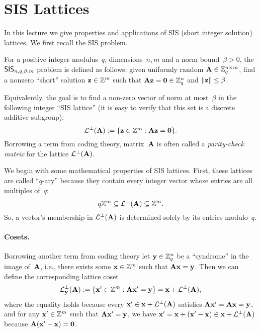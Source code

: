 \documentclass[11pt]{article}
\begin{document}
\thispagestyle{fancy} %


\section{SIS Lattices}
\label{sec:sis-lat}

In this lecture we give properties and applications of SIS (short
integer solution) lattices. We first recall the SIS problem.

\begin{definition}
  \label{def:sis-problem}
  For a positive integer modulus~$q$, dimensions~$n,m$ and a norm
  bound~$\beta > 0$, the $\mathsf{SIS}_{n,q,\beta,m}$ problem is defined as
  follows: given uniformly random $\mathbf{A} \in \mathbb{Z}_q^{n \times m}$, find a
  nonzero ``short'' solution $\mathbf{z} \in \mathbb{Z}^{m}$ such that
  $\mathbf{A} \mathbf{z} = \mathbf{0} \in \mathbb{Z}_q^{n}$ and
  $\lVert\mathbf{z}\rVert \leq \beta$.

  Equivalently, the goal is to find a non-zero vector of norm at
  most~$\beta$ in the following integer ``SIS lattice'' (it is easy to
  verify that this set is a discrete additive subgroup):
  \[ \mathcal{L}^{\perp}(\mathbf{A}) := \{\mathbf{z} \in \mathbb{Z}^{m} : \mathbf{A}\mathbf{z} = \mathbf{0}\}
    . \] Borrowing a term from coding theory, matrix~$\mathbf{A}$ is often
  called a \emph{parity-check matrix} for the lattice
  $\mathcal{L}^{\perp}(\mathbf{A})$.
\end{definition}

We begin with some mathematical properties of SIS lattices. First,
these lattices are called ``$q$-ary'' because they contain every
integer vector whose entries are all multiples of~$q$:
\[
  q\mathbb{Z}^{m} \subseteq \mathcal{L}^{\perp}(\mathbf{A}) \subseteq \mathbb{Z}^{m}.
\]
So, a vector's membership in $\mathcal{L}^{\perp}(\mathbf{A})$ is determined solely by
its entries modulo~$q$.

\paragraph{Cosets.}

Borrowing another term from coding theory let $\mathbf{y} \in \mathbb{Z}_q^{n}$ be a
``syndrome'' in the image of~$\mathbf{A}$, i.e., there exists some
$\mathbf{x} \in \mathbb{Z}^{m}$ such that $\mathbf{A} \mathbf{x} = \mathbf{y}$. Then we can define
the corresponding lattice coset
\[
  \mathcal{L}^{\perp}_{\mathbf{y}}(\mathbf{A}) := \{ \mathbf{x}' \in \mathbb{Z}^m : \mathbf{A} \mathbf{x}' =
    \mathbf{y} \} = \mathbf{x} + \mathcal{L}^{\perp}(\mathbf{A}) , \] where the equality holds
because every $\mathbf{x}' \in \mathbf{x} + \mathcal{L}^{\perp}(\mathbf{A})$ satisfies
$\mathbf{A} \mathbf{x}' = \mathbf{A} \mathbf{x} = \mathbf{y}$, and for any $\mathbf{x}' \in \mathbb{Z}^{m}$
such that $\mathbf{A} \mathbf{x}' = \mathbf{y}$, we have
$\mathbf{x}' = \mathbf{x} + (\mathbf{x}' - \mathbf{x}) \in \mathbf{x} + \mathcal{L}^{\perp}(\mathbf{A})$
because $\mathbf{A} (\mathbf{x}'-\mathbf{x}) = \mathbf{0}$.
\end{document}
